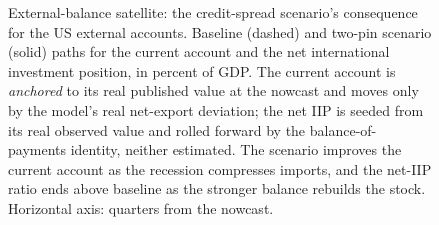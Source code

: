 \begin{figure}[t]
\centering
{}
\caption{External-balance satellite: the credit-spread scenario's consequence for the US external
accounts. Baseline (dashed) and two-pin scenario (solid) paths for the current account and the net
international investment position, in percent of GDP. The current account is \emph{anchored} to its
real published value at the nowcast and moves only by the model's real net-export deviation; the net
IIP is seeded from its real observed value and rolled forward by the balance-of-payments identity,
neither estimated. The scenario improves the current account as the recession compresses imports, and
the net-IIP ratio ends above baseline as the stronger balance rebuilds the stock. Horizontal axis:
quarters from the nowcast.}
\label{fig:external}
\end{figure}

